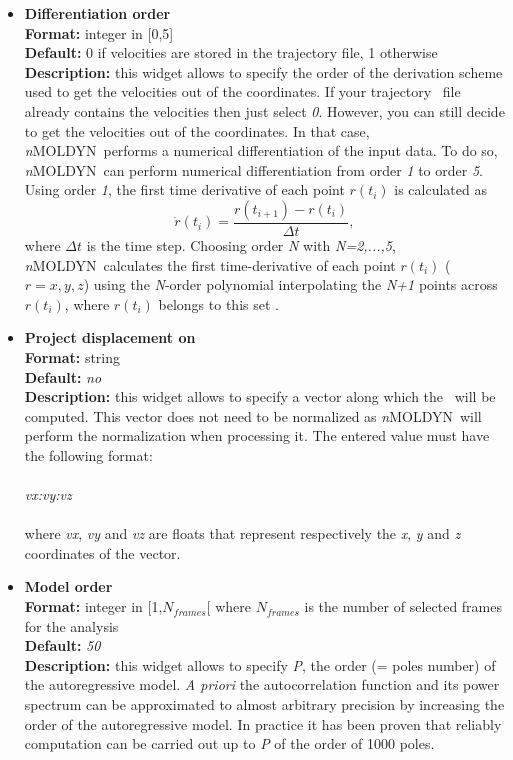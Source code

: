 \documentclass[a4paper,11pt]{report}
\newcommand{\NMOLDYN}{\textit{n}MOLDYN}
\begin{document}
\begin{itemize}
\hypertarget{ara_differentiation_order}{}
\item \textbf{Differentiation order}\\
\textbf{Format:} integer in [0,5]\\
\textbf{Default:} 0 if velocities are stored in the trajectory file, 1 otherwise\\
\textbf{Description:} this widget allows to specify the order of the derivation scheme used to get the velocities out 
of the coordinates. If your trajectory \NetCDF\ file already contains the velocities then just select \textit{0}.
However, you can still decide to get the velocities out of the coordinates. In that case, \NMOLDYN\ performs a numerical 
differentiation of the input data. To do so, \NMOLDYN\ can perform numerical differentiation from order \textit{1} to 
order \textit{5}. Using order \textit{1}, the first time derivative of each point $r(t_i)$ 
is calculated as
\begin{equation}
\dot{r}(t_i)=\frac{r(t_{i+1})-r(t_{i})} {\Delta t},
\end{equation}
where $\Delta t$ is the time step. 
Choosing order \textit{N} with \textit{N=2,...,5}, \NMOLDYN\ calculates the first time-derivative of each point 
$r(t_i)$ ($r=x,y,z$) using the \textit{N}-order polynomial interpolating the \textit{N+1} points across $r(t_i)$, where $r(t_i)$ 
belongs to this set \cite{Abramowitz}.

\hypertarget{ara_project_displacement_on}{}
\item \textbf{Project displacement on}\\
\textbf{Format:} string\\
\textbf{Default:} \textit{no}\\
\textbf{Description:} this widget allows to specify a vector along which the \ARA\ will be computed. This vector does not 
need to be normalized as \NMOLDYN\ will perform the normalization when processing it. The entered value must have the 
following format:
\\\\
\textit{vx:vy:vz}
\\\\
where \textit{vx}, \textit{vy} and \textit{vz} are floats that represent respectively the \textit{x}, \textit{y} and \textit{z} coordinates of the vector.

\hypertarget{ara_model_order}{}
\item \textbf{Model order}\\
\textbf{Format:} integer in [1,$N_{frames}$[ where $N_{frames}$ is the number of selected frames for the analysis\\
\textbf{Default:} \textit{50}\\
\textbf{Description:} this widget allows to specify \textit{P}, the order (= poles number) of the autoregressive model. {\it A priori} 
the autocorrelation function and its power spectrum can be approximated to almost arbitrary precision by increasing the 
order of the autoregressive model. In practice it has been proven that reliably computation can be carried out up to \textit{P} of 
the order of 1000 poles.


\end{itemize}
\end{document}
